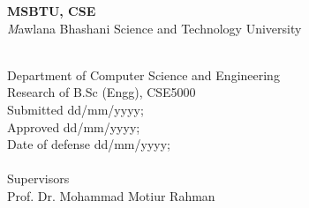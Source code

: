 \newpage


{
\fontsize{10}{11.4}\selectfont

\noindent \textbf{MSBTU, CSE} \\
\textit Mawlana Bhashani Science and Technology University}  \\
Department of Computer Science and Engineering
\\
Research of B.Sc (Engg), CSE5000
\\
Submitted \hspace{8mm} dd/mm/yyyy; \\
Approved \hspace{8.8mm} dd/mm/yyyy; \\
Date of defense \hspace{1.0mm} dd/mm/yyyy; \\
\\
Supervisors \\
Prof. Dr. Mohammad Motiur Rahman  \\
\\

\noindent\makebox[\linewidth]{\rule{\paperwidth}{0.4pt}} 

\vspace{3.0mm}

